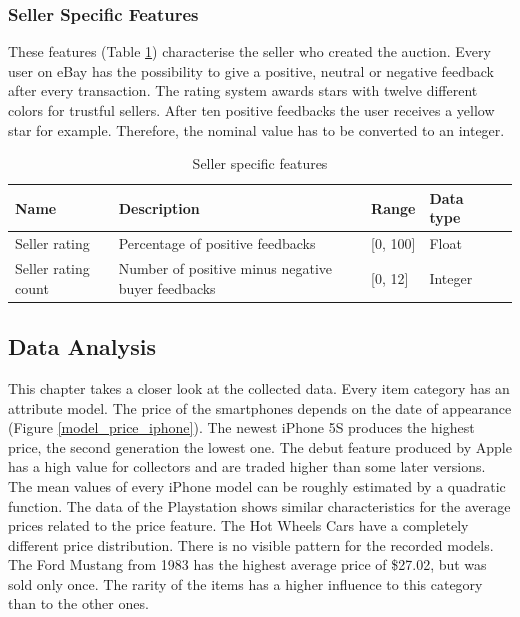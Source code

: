 \subsubsection{Seller Specific Features}
These features (Table \ref{tab:seller_features}) characterise the seller who created the auction. Every user on eBay has the possibility to give a positive, neutral or negative feedback after every transaction. The rating system awards stars with twelve different colors for trustful sellers. After ten positive feedbacks the user receives a yellow star for example. Therefore, the nominal value has to be converted to an integer.
\begin{table}[h!]
	\begin{center}
	\begin{tabular}{| p{2.6cm} | p{2.6cm} | p{2.6cm} | p{2.6cm} | p{2.6cm} |}
		\hline
		\textbf{Name} & \textbf{Description} &  \textbf{Range} & \textbf{Data type} \\
		\hline
		Seller rating & Percentage of positive feedbacks & [0, 100] & Float \\
		\hline
		Seller rating count & Number of positive minus negative buyer feedbacks & [0, 12] & Integer \\
		\hline
	\end{tabular}
	\end{center}
	\caption{Seller specific features}
	\label{tab:seller_features}
\end{table}
\subsection{Data Analysis}
This chapter takes a closer look at the collected data. Every item category has an attribute model. The price of the smartphones depends on the date of appearance (Figure \ref{model_price_iphone}). The newest iPhone 5S produces the highest price, the second generation the lowest one. The debut feature produced by Apple has a high value for collectors and are traded higher than some later versions. The mean values of every iPhone model can be roughly estimated by a quadratic function. The data of the Playstation shows similar characteristics for the average prices related to the price feature. The Hot Wheels Cars have a completely different price distribution. There is no visible pattern for the recorded models. The Ford Mustang from 1983 has the highest average price of \$27.02, but was sold only once. The rarity of the items has a higher influence to this category than to the other ones.

